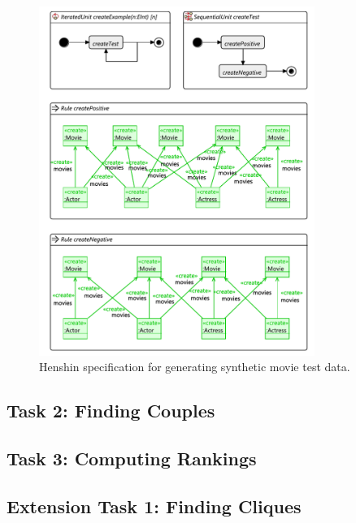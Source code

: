 \documentclass[a4paper]{article}
\begin{document}
\begin{figure}[p]
\centering
\includegraphics[width=0.8\textwidth]{gen-test-data}
\caption{Henshin specification for generating synthetic movie test data.}
\label{fig:gen-test-data}
\end{figure}

\subsection{Task 2: Finding Couples}

\subsection{Task 3: Computing Rankings}


\subsection{Extension Task 1: Finding Cliques}

\end{document}
